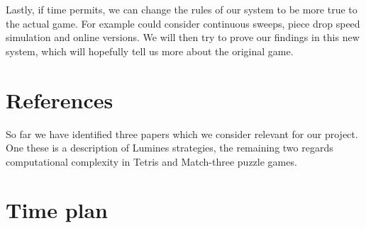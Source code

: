 \documentclass[a4paper,10pt]{article}
\begin{document}
Lastly, if time permits, we can change the rules of our system to be more true to the actual game. For example could consider continuous sweeps, piece drop speed simulation and online versions. We will then try to prove our findings in this new system, which will hopefully tell us more about the original game.

\section{References}
So far we have identified three papers which we consider relevant for our project. One these is a description of Lumines strategies, the remaining two regards computational complexity in Tetris \cite{tetris} and Match-three puzzle games.

\section{Time plan}

\printbibliography
\end{document}

